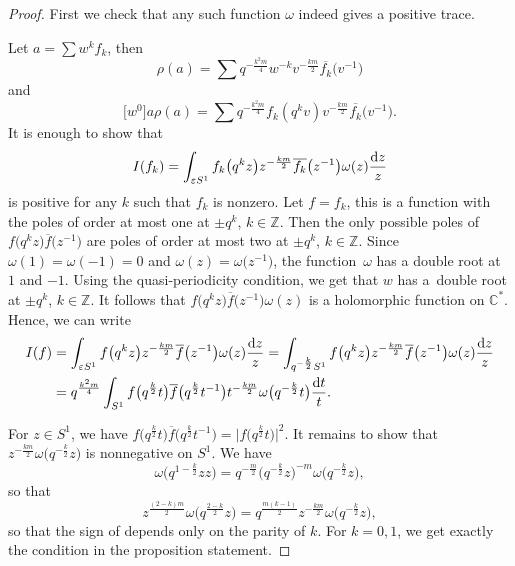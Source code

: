 \documentclass[pdftex]{sigma}
\newcommand\ZZ{\mathbb{Z}}
\newcommand\CC{\mathbb{C}}
\newcommand\eps{\varepsilon}
\newcommand{\ovl}{\overline}
\numberwithin{equation}{section}
\theoremstyle{definition}
\begin{document}
 \begin{proof}
 First we check that any such function $\omega$ indeed gives a positive trace.

 Let $a=\sum w^k f_k$, then \[\rho(a)=\sum q^{-\frac{k^2m}{4}}w^{-k}v^{-\frac{km}{2}}\ovl{f_k}\bigl(v^{-1}\bigr)\] and
 \begin{equation}
 \label{EqaRhoaAnyelement}
 \big[w^0\big]a\rho(a)=\sum q^{-\frac{k^2m}{4}} f_k(q^k v)v^{-\frac{km}{2}}\ovl{f_k}\bigl(v^{-1}\bigr).
 \end{equation}
 It is enough to show that \[I(f_k)=\int_{\eps S^1} f_k\bigl(q^k z\bigr)z^{-\frac{km}{2}}\ovl{f_k}\bigl(z^{-1}\bigr)\omega(z)\frac{{\rm d}z}{z}\] is positive for any $k$ such that $f_k$ is nonzero. Let $f=f_k$, this is a function with the poles of order at most one at $\pm q^k$, $k\in \ZZ$.
 Then the only possible poles of $f\bigl(q^k z\bigr)\ovl{f}\bigl(z^{-1}\bigr)$ are poles of order at most two at $\pm q^k$, $k\in \ZZ$. Since $\omega(1)=\omega(-1)=0$ and $\omega(z)=\omega\bigl(z^{-1}\bigr)$, the function~$\omega$ has a double root at $1$ and $-1$. Using the quasi-periodicity condition, we get that $w$ has a~double root at $\pm q^k$, $k\in \ZZ$. It follows that $f\bigl(q^k z\bigr)\ovl{f}\bigl(z^{-1}\bigr)\omega(z)$ is a holomorphic function on $\CC^*$. Hence, we can write
 \begin{align*}
 I(f)&=\int_{\eps S^1} f\bigl(q^k z\bigr)z^{-\frac{km}{2}}\ovl{f}\bigl(z^{-1}\bigr)\omega(z)\frac{{\rm d}z}{z}=\int_{q^{-\frac{k}{2}}S^1}f\bigl(q^k z\bigr)z^{-\frac{km}{2}}\ovl{f}\bigl(z^{-1}\bigr)\omega(z)\frac{{\rm d}z}{z}\\
& = q^{\frac{k^2m}{4}}\int_{S^1}f\bigl(q^{\frac{k}{2}}t\bigr)\ovl{f}\bigl(q^{\frac{k}{2}}t^{-1}\bigr)t^{-\frac{km}{2}}\omega\bigl(q^{-\frac{k}{2}}t\bigr)\frac{{\rm d}t}{t}.
 \end{align*}

 For $z\in S^1$, we have $f\bigl(q^{\frac{k}{2}}t\bigr)\ovl{f}\bigl(q^{\frac{k}{2}}t^{-1}\bigr)=\big\lvert f\bigl(q^{\frac{k}{2}}t\bigr)\big\rvert^2$. It remains to show that $z^{-\frac{km}{2}}\omega\bigl(q^{-\frac{k}{2}}z\bigr)$ is nonnegative on $S^1$. We have
 \[\omega\bigl(q^{1-\frac{k}{2}}zz\bigr)=q^{-\frac{m}{2}}\bigl(q^{-\frac{k}{2}}z\bigr)^{-m}\omega\bigl(q^{-\frac{k}{2}}z\bigr),\] so that
 \[
 z^{\frac{(2-k)m}{2}}\omega\bigl(q^{\frac{2-k}{2}}z\bigr)=q^{\frac{m(k-1)}{2}}z^{-\frac{km}{2}}\omega\bigl(q^{-\frac{k}{2}}z\bigr),
 \] so that the sign of  depends only on the parity of $k$. For $k=0,1$, we get exactly the condition in the proposition statement.


\end{proof}
\end{document}
